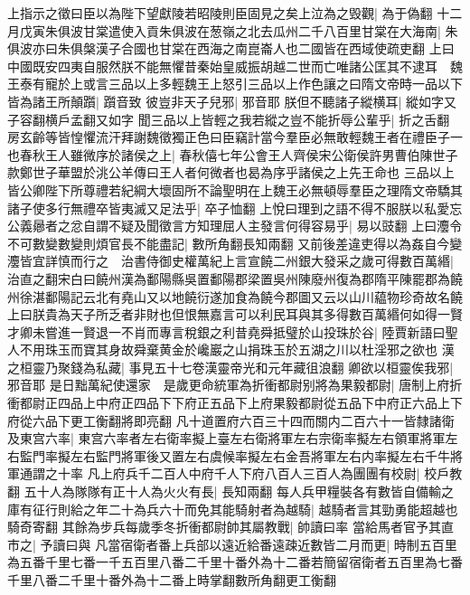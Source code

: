 上指示之徵曰臣以為陛下望獻陵若昭陵則臣固見之矣上泣為之毁觀|{
	為于偽翻}
十二月戊寅朱俱波甘棠遣使入貢朱俱波在葱嶺之北去瓜州二千八百里甘棠在大海南|{
	朱俱波亦曰朱俱槃漢子合國也甘棠在西海之南崑崙人也二國皆在西域使疏吏翻}
上曰中國既安四夷自服然朕不能無懼昔秦始皇威振胡越二世而亡唯諸公匡其不逮耳　魏王泰有寵於上或言三品以上多輕魏王上怒引三品以上作色讓之曰隋文帝時一品以下皆為諸王所顛躓|{
	躓音致}
彼豈非天子兒邪|{
	邪音耶}
朕但不聽諸子縱横耳|{
	縱如字又子容翻横戶孟翻又如字}
聞三品以上皆輕之我若縱之豈不能折辱公輩乎|{
	折之舌翻}
房玄齡等皆惶懼流汗拜謝魏徵獨正色曰臣竊計當今羣臣必無敢輕魏王者在禮臣子一也春秋王人雖微序於諸侯之上|{
	春秋僖七年公會王人齊侯宋公衛侯許男曹伯陳世子款鄭世子華盟於洮公羊傳曰王人者何微者也曷為序乎諸侯之上先王命也}
三品以上皆公卿陛下所尊禮若紀綱大壞固所不論聖明在上魏王必無頓辱羣臣之理隋文帝驕其諸子使多行無禮卒皆夷滅又足法乎|{
	卒子恤翻}
上悅曰理到之語不得不服朕以私愛忘公義曏者之忿自謂不疑及聞徵言方知理屈人主發言何得容易乎|{
	易以豉翻}
上曰灋令不可數變數變則煩官長不能盡記|{
	數所角翻長知兩翻}
又前後差違吏得以為姦自今變灋皆宜詳慎而行之　治書侍御史權萬紀上言宣饒二州銀大發采之歲可得數百萬緡|{
	治直之翻宋白曰饒州漢為鄱陽縣吳置鄱陽郡梁置吳州陳廢州復為郡隋平陳罷郡為饒州徐湛鄱陽記云北有堯山又以地饒衍遂加食為饒今郡圖又云以山川藴物珍奇故名饒}
上曰朕貴為天子所乏者非財也但恨無嘉言可以利民耳與其多得數百萬緡何如得一賢才卿未嘗進一賢退一不肖而專言稅銀之利昔堯舜抵璧於山投珠於谷|{
	陸賈新語曰聖人不用珠玉而寶其身故舜棄黄金於巉巖之山捐珠玉於五湖之川以杜淫邪之欲也}
漢之桓靈乃聚錢為私藏|{
	事見五十七卷漢靈帝光和元年藏徂浪翻}
卿欲以桓靈俟我邪|{
	邪音耶}
是日黜萬紀使還家　是歲更命統軍為折衝都尉别將為果毅都尉|{
	唐制上府折衝都尉正四品上中府正四品下下府正五品下上府果毅都尉從五品下中府正六品上下府從六品下更工衡翻將即亮翻}
凡十道置府六百三十四而關内二百六十一皆隸諸衛及東宫六率|{
	東宫六率者左右衛率擬上臺左右衛將軍左右宗衛率擬左右領軍將軍左右監門率擬左右監門將軍後又置左右虞候率擬左右金吾將軍左右内率擬左右千牛將軍通謂之十率}
凡上府兵千二百人中府千人下府八百人三百人為團團有校尉|{
	校戶教翻}
五十人為隊隊有正十人為火火有長|{
	長知兩翻}
每人兵甲糧裝各有數皆自備輸之庫有征行則給之年二十為兵六十而免其能騎射者為越騎|{
	越騎者言其勁勇能超越也騎奇寄翻}
其餘為步兵每歲季冬折衝都尉帥其屬教戰|{
	帥讀曰率}
當給馬者官予其直市之|{
	予讀曰與}
凡當宿衛者番上兵部以遠近給番遠疎近數皆二月而更|{
	時制五百里為五番千里七番一千五百里八番二千里十番外為十二番若簡留宿衛者五百里為七番千里八番二千里十番外為十二番上時掌翻數所角翻更工衡翻}


